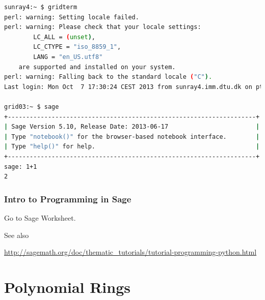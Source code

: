 \documentclass[9pt]{beamer}
\begin{document}
\begin{frame}
\begin{lstlisting}[language=bash,basicstyle=\tiny\tt]
sunray4:~ $ gridterm
perl: warning: Setting locale failed.
perl: warning: Please check that your locale settings:
        LC_ALL = (unset),
        LC_CTYPE = "iso_8859_1",
        LANG = "en_US.utf8"
    are supported and installed on your system.
perl: warning: Falling back to the standard locale ("C").
Last login: Mon Oct  7 17:30:24 CEST 2013 from sunray4.imm.dtu.dk on pts/18

grid03:~ $ sage
+--------------------------------------------------------------------+
| Sage Version 5.10, Release Date: 2013-06-17                        |
| Type "notebook()" for the browser-based notebook interface.        |
| Type "help()" for help.                                            |
+--------------------------------------------------------------------+
sage: 1+1
2
\end{lstlisting}

\end{frame}

\begin{frame}
\frametitle{Intro to Programming in Sage} 

\begin{block}{}
Go to Sage Worksheet. 
\end{block}

\vspace{2em}

See also 

\begin{center}
\footnotesize
\url{http://sagemath.org/doc/thematic_tutorials/tutorial-programming-python.html}
\end{center}

\end{frame}


\section{Polynomial Rings}
\end{document}

